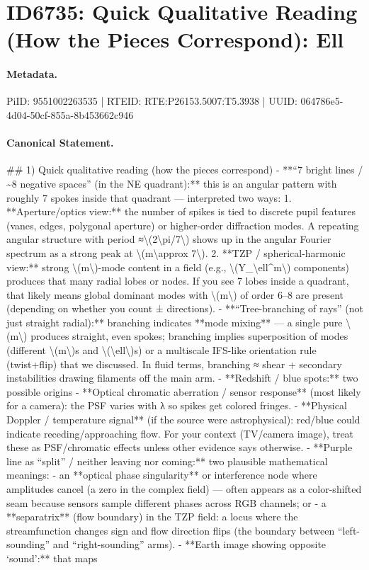 \section*{ID6735: Quick Qualitative Reading (How the Pieces Correspond): Ell}
\paragraph{Metadata.}
PiID: 9551002263535 | RTEID: RTE:P26153.5007:T5.3938 | UUID: 064786e5-4d04-50cf-855a-8b453662c946

\paragraph{Canonical Statement.}
\#\# 1) Quick qualitative reading (how the pieces correspond) - **“7 bright lines / \textasciitilde{}8 negative spaces” (in the NE quadrant):** this is an angular pattern with roughly 7 spokes inside that quadrant — interpreted two ways: 1. **Aperture/optics view:** the number of spikes is tied to discrete pupil features (vanes, edges, polygonal aperture) or higher-order diffraction modes. A repeating angular structure with period ≈\textbackslash{}(2\textbackslash{}pi/7\textbackslash{}) shows up in the angular Fourier spectrum as a strong peak at \textbackslash{}(m\textbackslash{}approx 7\textbackslash{}). 2. **TZP / spherical-harmonic view:** strong \textbackslash{}(m\textbackslash{})-mode content in a field (e.g., \textbackslash{}(Y\_\textbackslash{}ell\textasciicircum{}m\textbackslash{}) components) produces that many radial lobes or nodes. If you see 7 lobes inside a quadrant, that likely means global dominant modes with \textbackslash{}(m\textbackslash{}) of order 6–8 are present (depending on whether you count ± directions). - **“Tree-branching of rays” (not just straight radial):** branching indicates **mode mixing** — a single pure \textbackslash{}(m\textbackslash{}) produces straight, even spokes; branching implies superposition of modes (different \textbackslash{}(m\textbackslash{})s and \textbackslash{}(\textbackslash{}ell\textbackslash{})s) or a multiscale IFS-like orientation rule (twist+flip) that we discussed. In fluid terms, branching ≈ shear + secondary instabilities drawing filaments off the main arm. - **Redshift / blue spots:** two possible origins - **Optical chromatic aberration / sensor response** (most likely for a camera): the PSF varies with λ so spikes get colored fringes. - **Physical Doppler / temperature signal** (if the source were astrophysical): red/blue could indicate receding/approaching flow. For your context (TV/camera image), treat these as PSF/chromatic effects unless other evidence says otherwise. - **Purple line as “split” / neither leaving nor coming:** two plausible mathematical meanings: - an **optical phase singularity** or interference node where amplitudes cancel (a zero in the complex field) — often appears as a color-shifted seam because sensors sample different phases across RGB channels; or - a **separatrix** (flow boundary) in the TZP field: a locus where the streamfunction changes sign and flow direction flips (the boundary between “left-sounding” and “right-sounding” arms). - **Earth image showing opposite ‘sound’:** that maps 